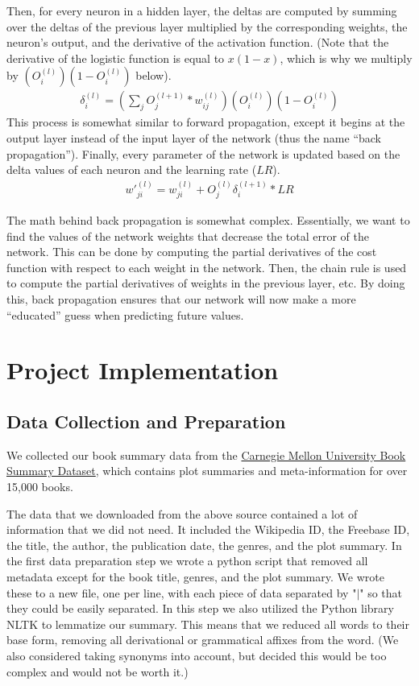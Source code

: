\documentclass[11pt,letterpaper]{article}
\begin{document}
Then, for every neuron in a hidden layer, the deltas are computed by summing over the deltas of the previous layer multiplied by the corresponding weights, the neuron's output, and the derivative of the activation function. (Note that the derivative of the logistic function is equal to $x(1-x)$, which is why we multiply by $(O^{(l)}_i) (1 - O^{(l)}_i)$ below).
\begin{align}
    \delta^{(l)}_i = (\sum_j O^{(l+1)}_j * w^{(l)}_{ij}) (O^{(l)}_i) (1 - O^{(l)}_i)
\end{align}
This process is somewhat similar to forward propagation, except it begins at the output layer instead of the input layer of the network (thus the name “back propagation”). Finally, every parameter of the network is updated based on the delta values of each neuron and the learning rate ($LR$).
\begin{align}
    w'^{(l)}_{ji} = w^{(l)}_{ji} + O^{(l)}_j\delta^{(l+1)}_i * LR
\end{align}

The math behind back propagation is somewhat complex. Essentially, we want to find the values of the network weights that decrease the total error of the network. This can be done by computing the partial derivatives of the cost function with respect to each weight in the network. Then, the chain rule is used to compute the partial derivatives of weights in the previous layer, etc. By doing this, back propagation ensures that our network will now make a more “educated” guess when predicting future values.

\section{Project Implementation}
\subsection{Data Collection and Preparation}

We collected our book summary data from the \href{http://www.cs.cmu.edu/~dbamman/booksummaries.html}{Carnegie Mellon University Book Summary Dataset}, which contains plot summaries and meta-information for over 15,000 books.

The data that we downloaded from the above source contained a lot of information that we did not need. It included
the Wikipedia ID, the Freebase ID, the title, the author, the publication date, the genres, and the plot summary.
In the first data preparation step we wrote a python script that removed all metadata except for the book title, genres, and the plot summary. We wrote these to a new file, one per line, with each piece of data separated by "$|$" so that they could be easily separated. In this step we also utilized the Python library NLTK to lemmatize our summary. This means that we reduced all words to their base form, removing all derivational or grammatical affixes from the word. (We also considered taking synonyms into account, but decided this would be too complex and would not be worth it.)
\end{document}
